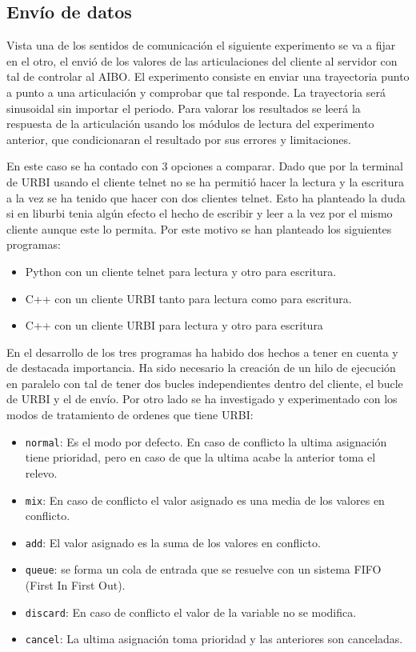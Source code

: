 \documentclass[12pt,a4paper,final,twoside]{book}
\begin{document}
\subsection{Envío de datos}\label{secenvdades}
Vista una de los sentidos de comunicación el siguiente experimento se va a fijar en el otro, el envió de los valores de las articulaciones del cliente al servidor con tal de controlar al AIBO.
El experimento consiste en enviar una trayectoria punto a punto a una articulación y comprobar que tal responde. La trayectoria será sinusoidal sin importar el periodo. Para valorar los resultados se leerá la respuesta de la articulación usando los módulos de lectura del experimento anterior, que condicionaran el resultado por sus errores y limitaciones. 

En este caso se ha contado con 3 opciones a comparar. Dado que por la terminal de URBI usando el cliente telnet no se ha permitió hacer la lectura y la escritura a la vez se ha tenido que hacer con dos clientes telnet. Esto ha planteado la duda si en liburbi tenia algún efecto el hecho de escribir y leer a la vez por el mismo cliente aunque este lo permita. Por este motivo se han planteado los siguientes programas:
\begin{itemize}
\item Python con un cliente telnet para lectura y otro para escritura.
\item C++ con un cliente URBI tanto para lectura como para escritura.
\item C++ con un cliente URBI para lectura y otro para escritura
\end{itemize}

En el desarrollo de los tres programas ha habido dos hechos a tener en cuenta y de destacada importancia.
Ha sido necesario la creación de un hilo de ejecución en paralelo con tal de tener dos bucles independientes dentro del cliente, el bucle de URBI y el de envío.
Por otro lado se ha investigado y experimentado con los modos de tratamiento  de ordenes que tiene URBI:
\begin{itemize}
\item \texttt{normal}: Es el modo por defecto. En caso de conflicto la ultima asignación tiene prioridad, pero en caso de que la ultima acabe la anterior toma el relevo.
\item \texttt{mix}: En caso de conflicto el valor asignado es una media de los valores en conflicto.
\item \texttt{add}: El valor asignado es la suma de los valores en conflicto.
\item \texttt{queue}: se forma un cola de entrada que se resuelve con un sistema FIFO (First In First Out).
\item \texttt{discard}: En caso de conflicto el valor de la variable no se modifica.
\item \texttt{cancel}: La ultima asignación toma prioridad y las anteriores son canceladas. 
\end{itemize}
\end{document}
